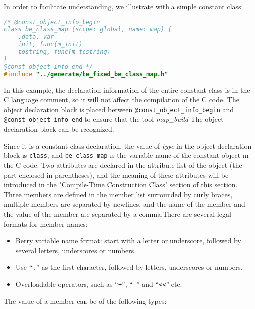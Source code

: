 In order to facilitate understanding, we illustrate with a simple constant class:
\begin{lstlisting}[language=c]
/* @const_object_info_begin
class be_class_map (scope: global, name: map) {
    .data, var
    init, func(m_init)
    tostring, func(m_tostring)
}
@const_object_info_end */
#include "../generate/be_fixed_be_class_map.h"
\end{lstlisting}
In this example, the declaration information of the entire constant class is in the C language comment, so it will not affect the compilation of the C code. The object declaration block is placed between \texttt{@const\_object\_info\_begin} and \texttt{@const\_object\_info\_end} to ensure that the tool \textsl{map\_build} The object declaration block can be recognized.

Since it is a constant class declaration, the value of \textsl{type} in the object declaration block is \texttt{class}, and \texttt{be\_class\_map} is the variable name of the constant object in the C code. Two attributes are declared in the attribute list of the object (the part enclosed in parentheses), and the meaning of these attributes will be introduced in the "Compile-Time Construction Class" section of this section. Three members are defined in the member list surrounded by curly braces, multiple members are separated by newlines, and the name of the member and the value of the member are separated by a comma.There are several legal formats for member names:
\begin{itemize}
    \item Berry variable name format: start with a letter or underscore, followed by several letters, underscores or numbers.
    \item Use ``\texttt{.}'' as the first character, followed by letters, underscores or numbers.
    \item Overloadable operators, such as ``\texttt{+}'', ``\texttt{-}'' and ``\texttt{<<}'' etc.
\end{itemize}
The value of a member can be of the following types:
